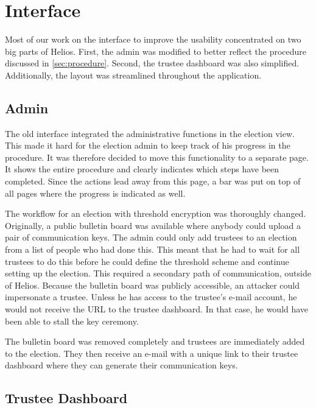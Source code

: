 % 
%

\section{Interface}

Most of our work on the interface to improve the usability concentrated on two big parts of Helios. First, the admin was modified to better reflect the procedure discussed in \ref{sec:procedure}. Second, the trustee dashboard was also simplified. Additionally, the layout was streamlined throughout the application.

\subsection{Admin}

The old interface integrated the administrative functions in the election view. This made it hard for the election admin to keep track of his progress in the procedure. It was therefore decided to move this functionality to a separate page. It shows the entire procedure and clearly indicates which steps have been completed. Since the actions lead away from this page, a bar was put on top of all pages where the progress is indicated as well.

\par The workflow for an election with threshold encryption was thoroughly changed. Originally, a public bulletin board was available where anybody could upload a pair of communication keys. The admin could only add trustees to an election from a list of people who had done this. This meant that he had to wait for all trustees to do this before he could define the threshold scheme and continue setting up the election. This required a secondary path of communication, outside of Helios. Because the bulletin board was publicly accessible, an attacker could impersonate a trustee. Unless he has access to the trustee's e-mail account, he would not receive the URL to the trustee dashboard. In that case, he would have been able to stall the key ceremony.

\par The bulletin board was removed completely and trustees are immediately added to the election. They then receive an e-mail with a unique link to their trustee dashboard where they can generate their communication keys.

\subsection{Trustee Dashboard}

